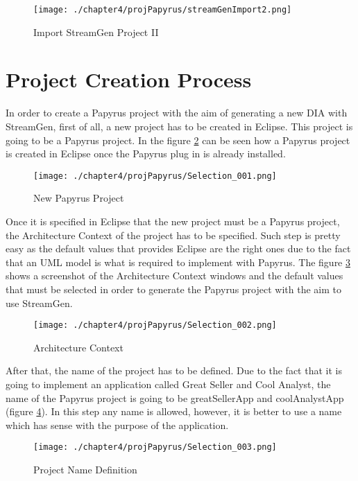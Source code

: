 \begin{figure}
\centering
{\texttt{[image: ./chapter4/projPapyrus/streamGenImport2.png]}}
\caption{Import StreamGen Project II}
\label{fig:Import StreamGen Project II}
\end{figure}

\section{Project Creation Process}

In order to create a Papyrus project with the aim of generating a new DIA with StreamGen, first of all, a new project has to be created in Eclipse. This project is going to be a Papyrus project. In the figure \ref{fig:Papyrus Project} can be seen how a Papyrus project is created in Eclipse once the Papyrus plug in is already installed.

\begin{figure}
\centering
{\texttt{[image: ./chapter4/projPapyrus/Selection\_001.png]}}
\caption{New Papyrus Project}
\label{fig:Papyrus Project}
\end{figure}

Once it is specified in Eclipse that the new project must be a Papyrus project, the Architecture Context of the project has to be specified. Such step is pretty easy as the default values that provides Eclipse are the right ones due to the fact that an UML model is what is required to implement with Papyrus. The figure \ref{fig:Architecture Context} shows a screenshot of the Architecture Context windows and the default values that must be selected in order to generate the Papyrus project with the aim to use StreamGen.

\begin{figure}
\centering
{\texttt{[image: ./chapter4/projPapyrus/Selection\_002.png]}}
\caption{Architecture Context}
\label{fig:Architecture Context}
\end{figure}

After that, the name of the project has to be defined. Due to the fact that it is going to implement an application called Great Seller and Cool Analyst, the name of the Papyrus project is going to be greatSellerApp and coolAnalystApp (figure \ref{fig:Project Name Definition}). In this step any name is allowed, however, it is better to use a name which has sense with the purpose of the application.

\begin{figure}
\centering
{\texttt{[image: ./chapter4/projPapyrus/Selection\_003.png]}}
\caption{Project Name Definition}
\label{fig:Project Name Definition}
\end{figure}


